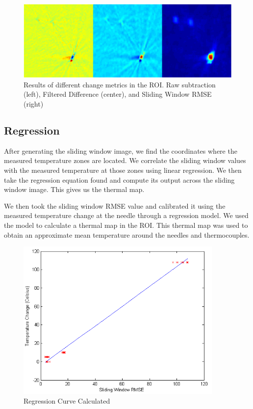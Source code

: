 \documentclass[]{spie}  %
\begin{document}
\begin{figure} 
\centering 
\includegraphics[width=\textwidth]{changeDetectionPanel2.png} 
\caption{Results of different change metrics in the ROI. Raw subtraction (left), Filtered Difference (center), and Sliding Window RMSE (right)} 
\end{figure}

\subsection{Regression}

After generating the sliding window image, we find the coordinates where the measured temperature zones are located. We correlate the sliding window values with the measured temperature at those zones using linear regression. We then take the regression equation found and compute its output across the sliding window image. This gives us the thermal map.  

We then took the sliding window RMSE value and calibrated it using the measured temperature change at the needle through a regression model. We used the model to calculate a thermal map in the ROI. This thermal map was used to obtain an approximate mean temperature around the needles and thermocouples.

\begin{figure} 
\centering 
\includegraphics[width=4in]{slidingDiffRegression.png} 
\caption{Regression Curve Calculated} 
\end{figure}
\end{document}
